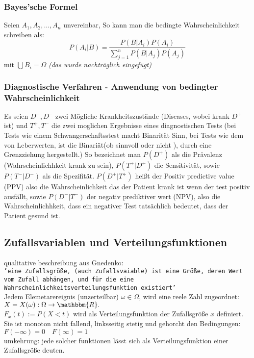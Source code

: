 \documentclass[a4paper]{article}
\theoremstyle{definition}
\theoremstyle{remark}
\begin{document}
\subsubsection{Bayes'sche Formel}
\label{ssub:bayes_sche_formel}

Seien $A_1,A_2,\dots,A_n$ unvereinbar, So kann man die bedingte Wahrscheinlichkeit schreiben als:
\begin{equation}
  P(A_i|B)=\frac{P(B|A_i)P(A_i)}{\sum_{j=1}^n P(B|A_j)P(A_j)}
\end{equation} 
mit $ \bigcup B_i=\Omega $
\textit{(das wurde nachträglich eingefügt)}

\subsubsection{Diagnostische Verfahren - Anwendung von bedingter Wahrscheinlichkeit}
\label{ssub:diagnostische_verfahren_anwendung_von_bedingter_wahrscheinlichkeit}

Es seien $D^+,D^-$ zwei Mögliche Krankheitszustände (Diseases, wobei krank $D^+$ ist) und $T^+,T^-$ 
die zwei moglichen Ergebnisse eines diagnostischen Tests 
(bei Tests wie einem Schwangerschaftsstest macht Binarität Sinn, bei Tests wie dem von Leberwerten, ist die Binariät(ob sinnvoll oder nicht ), durch eine Grenzziehung hergestellt.) 
So bezeichnet man $P(D^+)$ als die Prävalenz (Wahrscheinlichhkeit krank zu sein), $P(T^+|D^+)$ die Sensitivität, sowie $P(T^-|D^-)$ als die Spezifität. $P(D^+|T^+)$ heißt der Positiv predictive value (PPV) also die Wahrscheinlichkeit das der Patient krank ist wenn der test positiv ausfällt, sowie $P(D^-|T^-)$ der negativ prediktiver wert (NPV), also die Wahrscheinlichhkeit, dass ein negativer Test tatsächlich bedeutet, dass der Patient gesund ist.\\
  \subsection{Zufallsvariablen und Verteilungsfunktionen} %
\label{sub:subsection_name}


qualitative beschreibung aus Gnedenko:\\
\texttt{'eine Zufallsgröße, (auch Zufallsvaiable) ist eine Größe, deren Wert vom Zufall abhängen, und für die eine Wahrscheinlichkeitsverteilungsfunktion existiert'\\}
Jedem Elemetarereignis (unzerteilbar) $\omega \in \Omega $,  wird eine reele Zahl zugeordnet:\\
$X=X(\omega ):\Omega  \rightarrow \mathbbm{R}.$\\
$F_x(t):= P(X<t)$ wird als Verteilungsfunktion der Zufallsgröße $x$ definiert. Sie ist monoton nicht fallend, linksseitig stetig und gehorcht den Bedingungen: $F(-\infty)=0\quad F(\infty)=1$
\\
umkehrung: jede solcher funktionen lässt sich als Verteilungsfunktion einer Zufallsgröße deuten.
\end{document}
